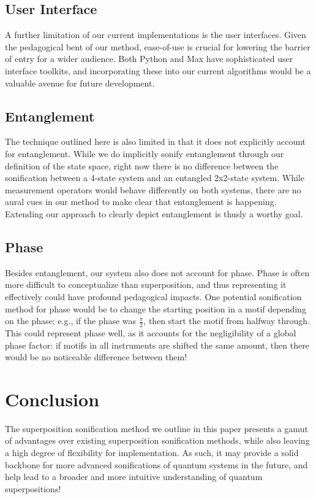 \documentclass[10pt,twocolumn]{article}
\begin{document}
\subsection{User Interface}

A further limitation of our current implementations is the user interfaces. Given the pedagogical bent of our method, ease-of-use is crucial for lowering the barrier of entry for a wider audience\cite{faghih2014}. Both Python and Max have sophisticated user interface toolkits, and incorporating these into our current algorithms would be a valuable avenue for future development.

\subsection{Entanglement}

The technique outlined here is also limited in that it does not explicitly account for entanglement. While we do implicitly sonify entanglement through our definition of the state space, right now there is no difference between the sonification between a 4-state system and an entangled 2x2-state system. While measurement operators would behave differently on both systems, there are no aural cues in our method to make clear that entanglement is happening. Extending our approach to clearly depict entanglement is thusly a worthy goal.

\subsection{Phase}

Besides entanglement, our system also does not account for phase. Phase is often more difficult to conceptualize than superposition, and thus representing it effectively could have profound pedagogical impacts. One potential sonification method for phase would be to change the starting position in a motif depending on the phase; e.g., if the phase was $\frac{\pi}{2}$, then start the motif from halfway through. This could represent phase well, as it accounts for the negligibility of a global phase factor: if motifs in all instruments are shifted the same amount, then there would be no noticeable difference between them!

\section{Conclusion}

The superposition sonification method we outline in this paper presents a gamut of advantages over existing superposition sonification methods, while also leaving a high degree of flexibility for implementation. As such, it may provide a solid backbone for more advanced sonifications of quantum systems in the future, and help lead to a broader and more intuitive understanding of quantum superpositions!
\end{document}
